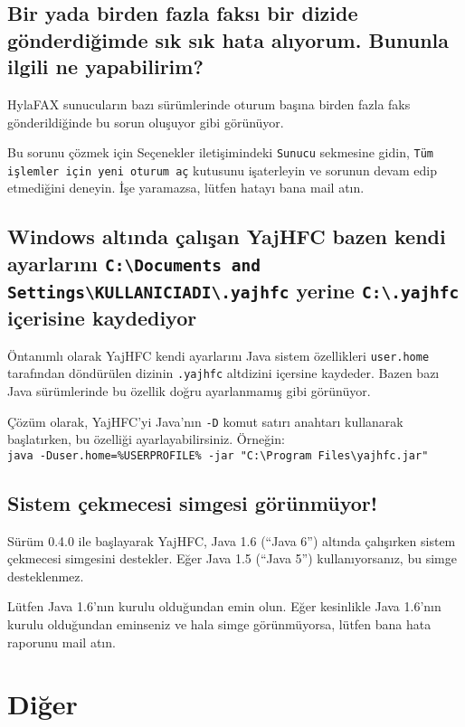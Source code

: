 \documentclass[a4paper,10pt]{scrartcl}
\begin{document}
\subsection{Bir yada birden fazla faksı bir dizide gönderdiğimde sık sık hata alıyorum. Bununla ilgili ne yapabilirim?}

HylaFAX sunucuların bazı sürümlerinde oturum başına birden fazla faks gönderildiğinde bu sorun oluşuyor gibi görünüyor.

Bu sorunu çözmek için Seçenekler iletişimindeki \texttt{Sunucu} sekmesine gidin, \texttt{Tüm işlemler için yeni oturum aç} kutusunu işaterleyin ve sorunun devam edip etmediğini deneyin.
İşe yaramazsa, lütfen hatayı bana mail atın.

\subsection{Windows altında çalışan YajHFC bazen kendi ayarlarını \texttt{C:\textbackslash Documents and Settings\textbackslash KULLANICIADI\textbackslash .yajhfc} yerine \texttt{C:\textbackslash .yajhfc} içerisine kaydediyor}

Öntanımlı olarak YajHFC kendi ayarlarını Java sistem özellikleri \texttt{user.home} tarafından döndürülen dizinin 
\texttt{.yajhfc} altdizini içersine kaydeder.
Bazen bazı Java sürümlerinde bu özellik doğru ayarlanmamış gibi görünüyor.

Çözüm olarak, YajHFC'yi Java'nın \texttt{-D} komut satırı anahtarı kullanarak başlatırken, bu özelliği ayarlayabilirsiniz. Örneğin: \\
\texttt{java -Duser.home=\%USERPROFILE\% -jar "C:\textbackslash Program Files\textbackslash yajhfc.jar"}

\subsection{Sistem çekmecesi simgesi görünmüyor!}

Sürüm 0.4.0 ile başlayarak YajHFC, Java 1.6 (``Java 6'') altında çalışırken sistem çekmecesi simgesini destekler. Eğer Java 1.5 (``Java 5'') kullanıyorsanız, bu simge desteklenmez.

Lütfen Java 1.6'nın kurulu olduğundan emin olun. Eğer kesinlikle Java 1.6'nın kurulu olduğundan eminseniz ve hala simge görünmüyorsa, lütfen bana hata raporunu mail atın.

\section{Diğer}
\end{document}

